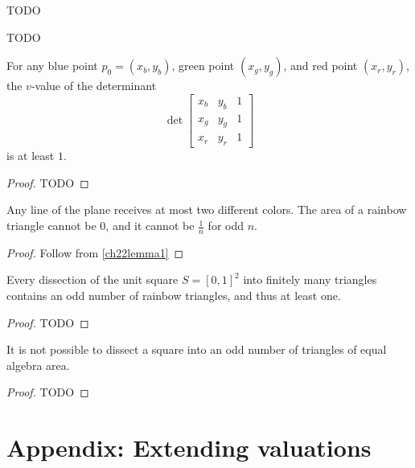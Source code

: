 \begin{definition}
  \label{three_coloring}
  TODO
\end{definition}

\begin{definition}
  \label{rainbow_triangle}
  TODO
\end{definition}


\begin{lemma}
  \label{ch22lemma1}
  For any blue point $p_0 = (x_b, y_b)$, green point $(x_g, y_g)$, and
  red point $(x_r, y_r)$, the $v$-value of the determinant
  \[
  \det \begin{bmatrix}
    x_b & y_b & 1 \\
    x_g & y_g & 1 \\
    x_r & y_r & 1
  \end{bmatrix}
  \] is at least $1$.
\end{lemma}
\begin{proof}
  TODO
\end{proof}

\begin{corollary}
  \label{ch22corollary}
  Any line of the plane receives at most two different colors.
  The area of a rainbow triangle cannot be $0$, and it cannot be
  $\frac{1}{n}$ for odd $n$.
\end{corollary}
\begin{proof}
  Follow from \ref{ch22lemma1}
\end{proof}

\begin{lemma}
  \label{ch22lemma2}
  Every dissection of the unit square $S = [0, 1]^2$ into finitely
  many triangles contains an odd number of rainbow triangles, and thus at least one.
\end{lemma}
\begin{proof}
  TODO
\end{proof}


\begin{theorem}
  \label{monsky_theorem}
  It is not possible to dissect a square into an odd number of triangles of equal algebra area.
\end{theorem}
\begin{proof}
  TODO
\end{proof}


\section*{Appendix: Extending valuations}


